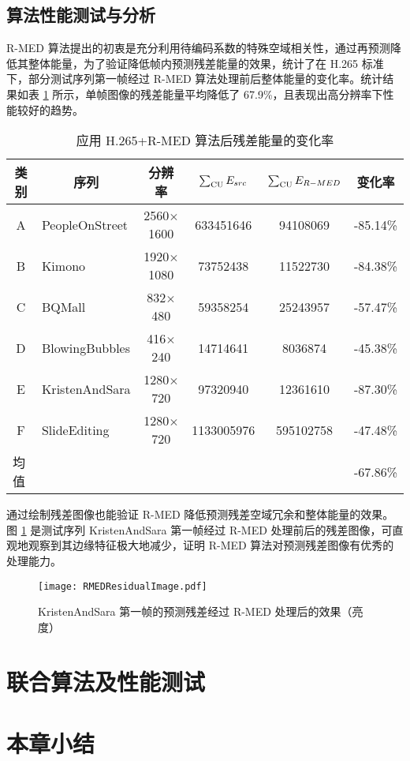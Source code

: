 \subsection{算法性能测试与分析}
R-MED 算法提出的初衷是充分利用待编码系数的特殊空域相关性，通过再预测降低其整体能量，为了验证降低帧内预测残差能量的效果，统计了在 H.265 标准下，部分测试序列第一帧经过 R-MED 算法处理前后整体能量的变化率。统计结果如表 \ref{tab:RMEDEnergy} 所示，单帧图像的残差能量平均降低了 67.9\%，且表现出高分辨率下性能较好的趋势。
\begin{table}[]
    \centering
    \caption{应用 H.265+R-MED 算法后残差能量的变化率}
    \label{tab:RMEDEnergy}
    \begin{tabular}{@{}clcccc@{}}
        \toprule
        类别                     & \multicolumn{1}{c}{序列} & 分辨率               & $\sum_{\rm CU}E_{src}$            & $\sum_{\rm CU}E_{R-MED}$          & 变化率                       \\ \midrule
        A                        & PeopleOnStreet           & 2560$\times$1600     & 633451646            & 94108069             & -85.14\%                     \\
        B                        & Kimono                   & 1920$\times$1080     & 73752438             & 11522730             & -84.38\%                     \\
        C                        & BQMall                   & 832$\times$480       & 59358254             & 25243957             & -57.47\%                     \\
        D                        & BlowingBubbles           & 416$\times$240       & 14714641             & 8036874              & -45.38\%                     \\
        E                        & KristenAndSara           & 1280$\times$720      & 97320940             & 12361610             & -87.30\%                     \\
        F                        & SlideEditing             & 1280$\times$720      & 1133005976           & 595102758            & -47.48\%                     \\ \midrule
        \multicolumn{1}{l}{均值} &                          & \multicolumn{1}{l}{} & \multicolumn{1}{l}{} & \multicolumn{1}{l}{} & \multicolumn{1}{l}{-67.86\%} \\ \bottomrule
    \end{tabular}
\end{table}
通过绘制残差图像也能验证 R-MED 降低预测残差空域冗余和整体能量的效果。图 \ref{fig:RMEDResidualImage} 是测试序列 KristenAndSara 第一帧经过 R-MED 处理前后的残差图像，可直观地观察到其边缘特征极大地减少，证明 R-MED 算法对预测残差图像有优秀的处理能力。
\begin{figure}[hbt]
    \centering
    \texttt{[image: RMEDResidualImage.pdf]}
    \caption{KristenAndSara 第一帧的预测残差经过 R-MED 处理后的效果（亮度）}
    \label{fig:RMEDResidualImage}
\end{figure}

\section{联合算法及性能测试}

\section{本章小结}